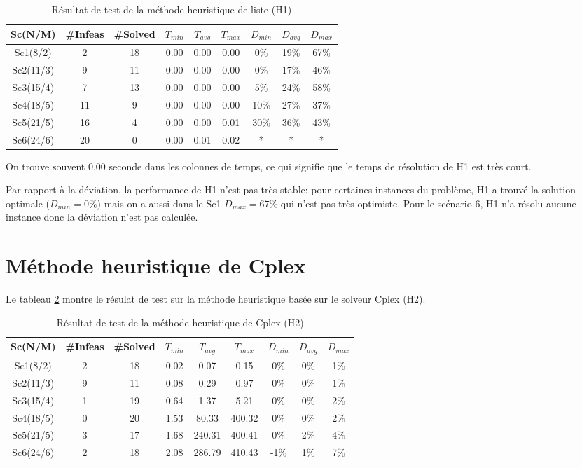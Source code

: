 \begin{table}[h]
    \centering
    \begin{tabular}{|c|c|c|c|c|c|c|c|c|}
    	\hline
    	Sc(N/M)	& \#Infeas & \#Solved	& $T_{min}$ & $T_{avg}$	& $T_{max}$ & $D_{min}$ & $D_{avg}$	& $D_{max}$ \\ \hline
		Sc1(8/2)  & 2 & 18 & 0.00 & 0.00 & 0.00 &0\% &19\% &67\% \\ \hline
Sc2(11/3) & 9 & 11 & 0.00 & 0.00 & 0.00 &0\% &17\% &46\% \\ \hline
Sc3(15/4) & 7 & 13 & 0.00 & 0.00 & 0.00 &5\% &24\% &58\% \\ \hline
Sc4(18/5) & 11 & 9 & 0.00 & 0.00 & 0.00 &10\%& 27\%& 37\% \\ \hline
Sc5(21/5) & 16 & 4 & 0.00 & 0.00 & 0.01 &30\%& 36\%& 43\% \\ \hline
Sc6(24/6) & 20 & 0 & 0.00 & 0.01 & 0.02 & * & * & * \\ \hline
    \end{tabular}
    \caption{Résultat de test de la méthode heuristique de liste (H1)}
    \label{tab_h1}
\end{table}
\bigskip

On trouve souvent 0.00 seconde dans les colonnes de temps, ce qui signifie que le temps de résolution de H1 est très court.


Par rapport à la déviation, la performance de H1 n'est pas très stable: pour certaines instances du problème, H1 a trouvé la solution optimale ($D_{min}=0\%$) mais on a aussi dans le Sc1 $D_{max}=67\%$ qui n'est pas très optimiste. Pour le scénario 6, H1 n'a résolu aucune instance donc la déviation n'est pas calculée.


\section{Méthode heuristique de Cplex}
Le tableau \ref{tab_h2} montre le résulat de test sur la méthode heuristique basée sur le solveur Cplex (H2).


\begin{table}[h]
    \centering
    \begin{tabular}{|c|c|c|c|c|c|c|c|c|}
    	\hline
    	Sc(N/M)	& \#Infeas & \#Solved	& $T_{min}$ & $T_{avg}$	& $T_{max}$ & $D_{min}$ & $D_{avg}$	& $D_{max}$ \\ \hline
		Sc1(8/2)  &2 & 18 &  0.02 &  0.07   &0.15     &0\%  &0\%  &1\% \\ \hline
Sc2(11/3) &9 & 11 &  0.08 &  0.29   &0.97     &0\%  &0\%  &1\% \\ \hline
Sc3(15/4) &1 & 19 &  0.64 &  1.37   &5.21     &0\%  &0\%  &2\% \\ \hline
Sc4(18/5) &0 & 20 &  1.53 &  80.33  & 400.32  &0\%  &0\%  &2\% \\ \hline
Sc5(21/5) &3 & 17 &  1.68 &  240.31 &  400.41 & 0\% & 2\% & 4\% \\ \hline
Sc6(24/6) &2 & 18 &  2.08 &  286.79 &  410.43 & -1\%&  1\%&  7\% \\ \hline
    \end{tabular}
    \caption{Résultat de test de la méthode heuristique de Cplex (H2)}
    \label{tab_h2}
\end{table}
\bigskip


